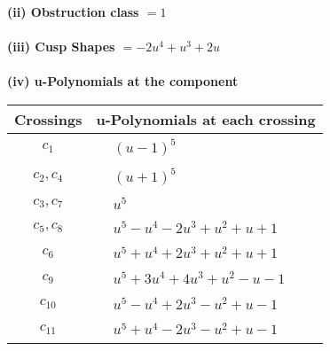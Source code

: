 \documentclass[1p]{elsarticle_modified}
\theoremstyle{definition}
\begin{document}
\flushleft \textbf{(ii) Obstruction class $= 1$}\\~\\
\flushleft \textbf{(iii) Cusp Shapes $= -2 u^4+u^3+2 u$}\\~\\
\newpage\renewcommand{\arraystretch}{1}
\flushleft \textbf{(iv) u-Polynomials at the component}\newline \\
\begin{tabular}{m{50pt}|m{274pt}}
Crossings & \hspace{64pt}u-Polynomials at each crossing \\
\hline $$\begin{aligned}c_{1}\end{aligned}$$&$\begin{aligned}
&(u-1)^5
\end{aligned}$\\
\hline $$\begin{aligned}c_{2},c_{4}\end{aligned}$$&$\begin{aligned}
&(u+1)^5
\end{aligned}$\\
\hline $$\begin{aligned}c_{3},c_{7}\end{aligned}$$&$\begin{aligned}
&u^5
\end{aligned}$\\
\hline $$\begin{aligned}c_{5},c_{8}\end{aligned}$$&$\begin{aligned}
&u^5- u^4-2 u^3+u^2+u+1
\end{aligned}$\\
\hline $$\begin{aligned}c_{6}\end{aligned}$$&$\begin{aligned}
&u^5+u^4+2 u^3+u^2+u+1
\end{aligned}$\\
\hline $$\begin{aligned}c_{9}\end{aligned}$$&$\begin{aligned}
&u^5+3 u^4+4 u^3+u^2- u-1
\end{aligned}$\\
\hline $$\begin{aligned}c_{10}\end{aligned}$$&$\begin{aligned}
&u^5- u^4+2 u^3- u^2+u-1
\end{aligned}$\\
\hline $$\begin{aligned}c_{11}\end{aligned}$$&$\begin{aligned}
&u^5+u^4-2 u^3- u^2+u-1
\end{aligned}$\\
\hline
\end{tabular}\\~\\
\end{document}
